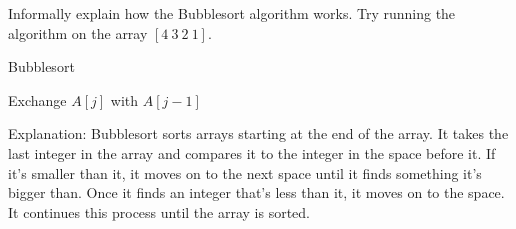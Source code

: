 \documentclass[12pt]{article}
\newenvironment{problem}[2][Problem]{\begin{trivlist}
\item[\hskip \labelsep {\bfseries #1}\hskip \labelsep {\bfseries #2.}]}{\end{trivlist}}
\begin{document}
\begin{problem}{9}
Informally explain how the Bubblesort algorithm works.
Try running the algorithm on the array
$[4\ 3\ 2\ 1]$.
\end{problem}

\begin{algorithm}[H]
 \caption{Bubblesort}
 \begin{algorithmic}[1]
    \State Exchange $A[j]$ with $A[j-1]$
   \EndIf
  \EndFor
 \EndFor
 \EndProcedure
\end{algorithmic}
\end{algorithm}

Explanation: Bubblesort sorts arrays starting at the end of the array. It takes the last integer in the array and compares it to the integer in the space before it. If it's smaller than it, it moves on to the next space until it finds something it's bigger than. Once it finds an integer that's less than it, it moves on to the space. It continues this process until the array is sorted.


\end{document}
